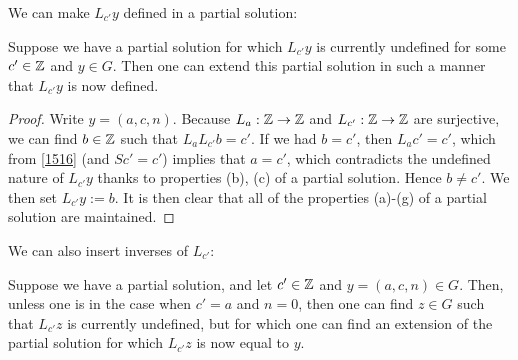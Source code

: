 We can make $L_{c'} y$ defined in a partial solution:

\begin{lemma}\label{first-ext}  Suppose we have a partial solution for which $L_{c'} y$ is currently undefined for some $c' \in \mathbb{Z}$ and $y \in G$.  Then one can extend this partial solution in such a manner that $L_{c'} y$ is now defined.
\end{lemma}

\begin{proof} Write $y = (a,c,n)$. Because $L_a: \mathbb{Z} \to \mathbb{Z}$ and $L_{c'}: \mathbb{Z} \to \mathbb{Z}$ are surjective, we can find $b \in \mathbb{Z}$ such that $L_a L_{c'} b = c'$.  If we had $b=c'$, then $L_a c' = c'$, which from \eqref{1516} (and $Sc' = c'$) implies that $a = c'$, which contradicts the undefined nature of $L_{c'} y$ thanks to properties (b), (c) of a partial solution.  Hence $b \neq c'$.
  We then set $L_{c'} y := b$.  It is then clear that all of the properties (a)-(g) of a partial solution are maintained.
\end{proof}

We can also insert inverses of $L_{c'}$:

\begin{lemma}\label{second-ext}  Suppose we have a partial solution, and let $c' \in \mathbb{Z}$ and $y = (a,c,n) \in G$.  Then, unless one is in the case when $c'=a$ and $n=0$, then one can find $z \in G$ such that $L_{c'} z$ is currently undefined, but for which one can find an extension of the partial solution for which $L_{c'} z$ is now equal to $y$.
\end{lemma}

